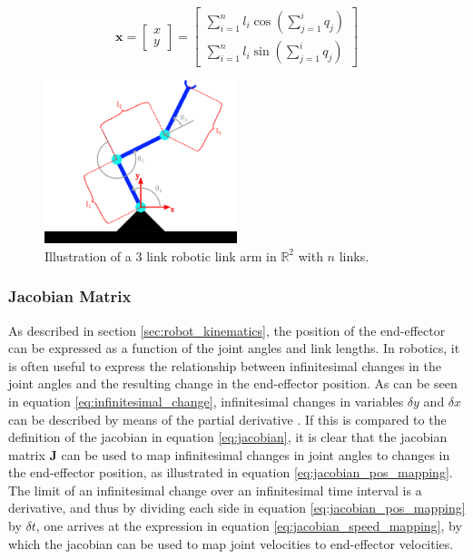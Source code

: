 \begin{equation}
    \label{eq:robot_kinematics}
    \mathbf{x} = \begin{bmatrix}
        x \\
        y
    \end{bmatrix} = \begin{bmatrix}
        \sum_{i=1}^{n} l_i \cos\left(\sum_{j=1}^{i} q_j\right) \\
        \sum_{i=1}^{n} l_i \sin\left(\sum_{j=1}^{i} q_j\right)
    \end{bmatrix}
\end{equation}

\begin{figure}[H]
    \centering
    \includegraphics[width=0.5\textwidth]{Images/manipulator_inkscape.png}
    \caption{Illustration of a 3 link robotic link arm in $\mathbb{R}^2$ with $n$ links.}
    \label{fig:robotic_link_arm}
\end{figure}


    \subsubsection{Jacobian Matrix}

As described in section \ref{sec:robot_kinematics}, the position of the end-effector can be expressed as a function of the joint angles and link lengths. In robotics, it is often useful to express the relationship between infinitesimal changes in the joint angles and the resulting change in the end-effector position. As can be seen in equation \ref{eq:infinitesimal_change}, infinitesimal changes in variables $\delta y$ and $\delta x$ can be described by means of the partial derivative \cite{modsim}. If this is compared to the definition of the jacobian in equation \ref{eq:jacobian}, it is clear that the jacobian matrix $\mathbf{J}$ can be used to map infinitesimal changes in joint angles to changes in the end-effector position, as illustrated in equation \ref{eq:jacobian_pos_mapping}. The limit of an infinitesimal change over an infinitesimal time interval is a derivative, and thus by dividing each side in equation \ref{eq:jacobian_pos_mapping} by $\delta t$, one arrives at the expression in equation \ref{eq:jacobian_speed_mapping}, by which the jacobian can be used to map joint velocities to end-effector velocities.

